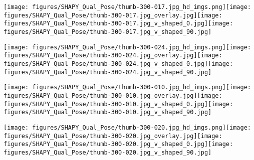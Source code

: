 \documentclass[10pt,twocolumn,letterpaper]{article}
\newcommand{\modelCOLOR}{black}
\newcommand{\modelname}{{\color{\modelCOLOR}SHAPY}\xspace}
\begin{document}
\begin{appendices}
\begin{figure*}[th]
    \caption{Qualitative results of \modelname predictions for female bodies. }
    
\end{figure*}

\begin{figure*}[th]
    \centering
    \texttt{[image: figures/SHAPY\_Qual\_Pose/thumb-300-017.jpg\_hd\_imgs.png]}\texttt{[image: figures/SHAPY\_Qual\_Pose/thumb-300-017.jpg\_overlay.jpg]}\texttt{[image: figures/SHAPY\_Qual\_Pose/thumb-300-017.jpg\_v\_shaped\_0.jpg]}\texttt{[image: figures/SHAPY\_Qual\_Pose/thumb-300-017.jpg\_v\_shaped\_90.jpg]}
    
    \texttt{[image: figures/SHAPY\_Qual\_Pose/thumb-300-024.jpg\_hd\_imgs.png]}\texttt{[image: figures/SHAPY\_Qual\_Pose/thumb-300-024.jpg\_overlay.jpg]}\texttt{[image: figures/SHAPY\_Qual\_Pose/thumb-300-024.jpg\_v\_shaped\_0.jpg]}\texttt{[image: figures/SHAPY\_Qual\_Pose/thumb-300-024.jpg\_v\_shaped\_90.jpg]}

    \caption{Qualitative results of \modelname predictions for female bodies. (Cont.) }
    \label{fig:shapy_qual_pose_female}
\end{figure*}
    

\begin{figure*}
    \centering
        \texttt{[image: figures/SHAPY\_Qual\_Pose/thumb-300-010.jpg\_hd\_imgs.png]}\texttt{[image: figures/SHAPY\_Qual\_Pose/thumb-300-010.jpg\_overlay.jpg]}\texttt{[image: figures/SHAPY\_Qual\_Pose/thumb-300-010.jpg\_v\_shaped\_0.jpg]}\texttt{[image: figures/SHAPY\_Qual\_Pose/thumb-300-010.jpg\_v\_shaped\_90.jpg]}
        
        \texttt{[image: figures/SHAPY\_Qual\_Pose/thumb-300-020.jpg\_hd\_imgs.png]}\texttt{[image: figures/SHAPY\_Qual\_Pose/thumb-300-020.jpg\_overlay.jpg]}\texttt{[image: figures/SHAPY\_Qual\_Pose/thumb-300-020.jpg\_v\_shaped\_0.jpg]}\texttt{[image: figures/SHAPY\_Qual\_Pose/thumb-300-020.jpg\_v\_shaped\_90.jpg]}
        

\end{figure*}
\end{appendices}
\end{document}
